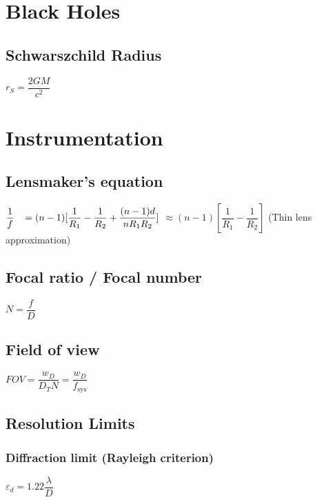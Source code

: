 	\section{Black Holes}

\subsection{Schwarszchild Radius}		
\begin{itemize}
\itemt \( r_S = \dfrac{2GM}{c^2} \)
\end{itemize}

	\section{Instrumentation}

\subsection{Lensmaker's equation}
\begin{itemize}
\itemt \( \dfrac{1}{f} \hspace*{0.3cm} = (n-1)[\dfrac{1}{R_1} - \dfrac{1}{R_2}+\dfrac{(n-1)d}{nR_1R_2}] \)
\subitem \hspace*{0.85cm} \( \approx (n-1)[\dfrac{1}{R_1} - \dfrac{1}{R_2}] \) \tab     (Thin lens approximation)
\end{itemize}

\subsection{Focal ratio / Focal number}
\begin{itemize}
\itemt \( N = \dfrac{f}{D} \)
\end{itemize}			

\subsection{Field of view}		
\begin{itemize}
\itemt \( FOV = \dfrac{w_D}{D_T N} = \dfrac{w_D}{f_\mathrm{sys}} \)
\end{itemize}

\subsection{Resolution Limits}		

\subsubsection{Diffraction limit (Rayleigh criterion)}			
\begin{itemize}
\itemt \( \varepsilon_d = 1.22 \dfrac{\lambda}{D} \)
\end{itemize}			

